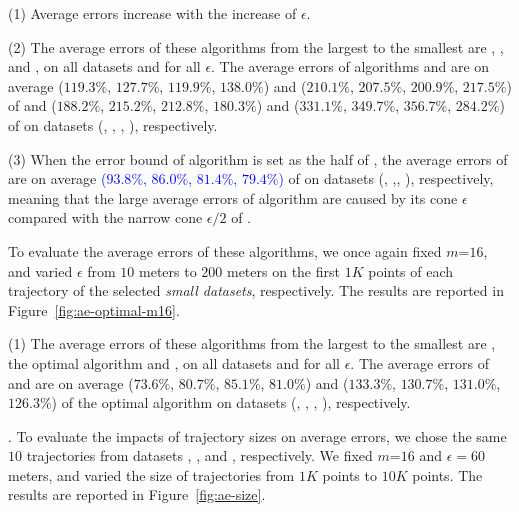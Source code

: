 {\ni(1) Average errors increase with the increase of $\epsilon$.

\ni(2) The average errors of these algorithms from the largest to the smallest are \cista, \cist, \dps and \squishe, on all datasets and for all $\epsilon$.
The average errors of algorithms \cist and \cista are on average
($119.3\%$, $127.7\%$, $119.9\%$, $138.0\%$)
and ($210.1\%$, $207.5\%$, $200.9\%$, $217.5\%$)
of \dps and ($188.2\%$, $215.2\%$, $212.8\%$, $180.3\%$) and
($331.1\%$, $349.7\%$, $356.7\%$, $284.2\%$)
 of \squishe on datasets (\sercar, \geolife, \mopsi, \pricar), respectively.

\ni(3) When the error bound of algorithm \cista is set as the half of \cist, the
average errors of \cista are on average \textcolor{blue}{($93.8\%$, $86.0\%$, $81.4\%$, {$79.4\%$})} of \cist on {datasets} (\sercar, \geolife,\mopsi, \pricar), respectively, meaning that the large average errors of algorithm \cista are caused by its cone \wrt $\epsilon$ compared with the narrow cone \wrt $\epsilon/2$ of \cist.

To evaluate the average errors of these algorithms, we once again fixed {$m$=$16$}, and
varied $\epsilon$ from $10$ meters to $200$ meters on the first $1K$ points of each trajectory of the selected \textit{small datasets}, respectively.
The results are reported in Figure~\ref{fig:ae-optimal-m16}.

\ni(1) The average errors of these algorithms from the largest to the smallest are \cista, the optimal algorithm and \cist, on all datasets and for all $\epsilon$.
The average errors of \cist and \cista are on average
($73.6\%$, $80.7\%$, $85.1\%$, $81.0\%$)
and ($133.3\%$, $130.7\%$, $131.0\%$, $126.3\%$)
of the optimal algorithm on datasets (\sercar, \geolife, \mopsi, \pricar), respectively.

.
To evaluate the impacts of trajectory sizes on average errors, we chose the same
{$10$} trajectories from  datasets \sercar, \geolife, \mopsi and \pricar, respectively.
We fixed {$m$=$16$} and $\epsilon = 60$ meters, and varied the size  of trajectories from $1K$ points to $10K$ points.
%
The results are reported in Figure~\ref{fig:ae-size}.

}

